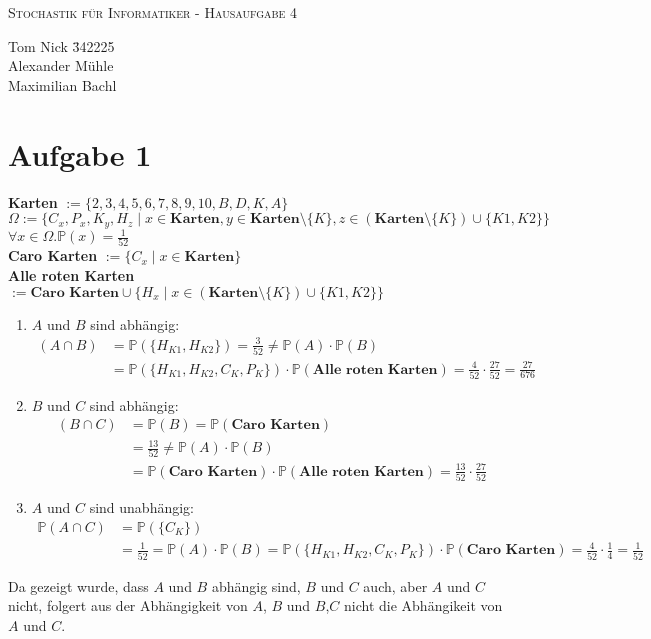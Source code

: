 \documentclass[10pt,a4paper,parskip=half]{scrartcl}
\newcommand{\PP}{\mathbb{P}}
\begin{document}
\begin{center}
\textsc{\Large{Stochastik für Informatiker - Hausaufgabe 4}} \\
\end{center}
\begin{tabbing}
Tom Nick \hspace{1.4cm}\= 342225\\
Alexander Mühle\\
Maximilian Bachl
\end{tabbing}
\section*{Aufgabe 1}
\textbf{Karten} $:= \{2,3,4,5,6,7,8,9,10,B,D,K,A\}$ \\
$\Omega := \{C_x, P_x, K_y, H_z \mid x \in \textbf{Karten}, y \in \textbf{Karten}\setminus\{K\}, z \in (\textbf{Karten}\setminus\{K\})\cup\{K1,K2\}\}$ \\
$\forall x \in \Omega. \PP(x) = \frac{1}{52}$ \\
\textbf{Caro Karten} $:= \{C_x \mid x \in \textbf{Karten}\}$ \\
\textbf{Alle roten Karten} $:= \textbf{Caro Karten}   \cup \{H_x \mid x \in (\textbf{Karten}\setminus\{K\})\cup\{K1,K2\}\}$ \\
\begin{enumerate}
	\item $A$ und $B$ sind abhängig: \\
			 \begin{align*}(A \cap B) &= \PP(\{H_{K1}, H_{K2}\}) = \frac{3}{52} \neq \PP(A) \cdot \PP(B) \\
			 &=  \PP(\{H_{K1},H_{K2},C_{K},P_K\}) \cdot \PP(\textbf{Alle roten Karten}) = \frac{4}{52} \cdot \frac{27}{52} = \frac{27}{676} 			 
			 \end{align*}
	\item $B$ und $C$ sind abhängig: \\
			 \begin{align*}(B \cap C) &= \PP(B) = \PP(\textbf{Caro Karten} ) \\
			 &= \frac{13}{52} \neq \PP(A) \cdot \PP(B) \\
			 &=   \PP(\textbf{Caro Karten}) \cdot \PP(\textbf{Alle roten Karten}) = \frac{13}{52} \cdot \frac{27}{52} 
			 \end{align*}
	\item $A$ und $C$ sind unabhängig: \\
			 \begin{align*}\PP(A \cap C) &= \PP(\{C_K\} ) \\
			 &= \frac{1}{52} = \PP(A) \cdot \PP(B) = \PP(\{H_{K1},H_{K2},C_{K},P_K\}) \cdot \PP(\textbf{Caro Karten}) = \frac{4}{52} \cdot \frac14 = \frac{1}{52}
			 \end{align*}
\end{enumerate}
Da gezeigt wurde, dass $A$ und $B$ abhängig sind, $B$ und $C$ auch, aber $A$ und $C$ nicht, folgert aus der Abhängigkeit von $A$, $B$ und $B$,$C$ nicht die Abhängikeit von $A$ und $C$.
\end{document}
